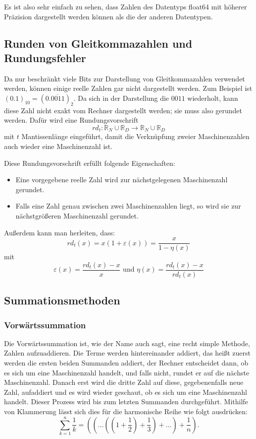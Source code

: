 \documentclass{scrartcl}
\begin{document}
Es ist also sehr einfach zu sehen, dass Zahlen des Datentyps float64 mit
höherer Präzision dargestellt werden können als die der anderen Datentypen.

\subsection{Runden von Gleitkommazahlen und Rundungsfehler}
Da nur beschränkt viele Bits zur Darstellung von Gleitkommazahlen verwendet
werden, können einige reelle Zahlen gar nicht dargestellt werden.
Zum Beispiel ist \( (0.1)_{10} = (0.
\overline{0011})_2 \).
Da sich in der Darstellung die \(0011\) wiederholt, kann diese Zahl nicht exakt
vom Rechner dargestellt werden; sie muss also gerundet werden.
Dafür wird eine Rundungsvorschrift
\begin{equation*}
    rd_t: \mathbb{R}_N \cup \mathbb{R}_D \rightarrow \mathbb{R}_N \cup \mathbb{R}_D
\end{equation*}
mit \(t\) Mantissenlänge eingeführt, damit die Verknüpfung zweier Maschinenzahlen auch wieder eine
Maschinenzahl ist.

Diese Rundungsvorschrift erfüllt folgende Eigenschaften:
\begin{itemize}
    \item Eine vorgegebene reelle Zahl wird zur nächstgelegenen Maschinenzahl gerundet.
    \item Falls eine Zahl genau zwischen zwei Maschinenzahlen liegt, so wird sie zur nächstgrößeren Maschinenzahl gerundet.
\end{itemize}

Außerdem kann man herleiten, dass: \[ rd_t(x) = x(1+\varepsilon(x)) =
    \frac{x}{1-\eta(x)} \] mit \[ \varepsilon(x) = \frac{rd_t(x) - x}{x} \text{ und
    } \eta(x) = \frac{rd_t(x) - x}{rd_t(x)} \]

\subsection{Summationsmethoden} \subsubsection{Vorwärtssummation} Die
Vorwärtssummation ist, wie der Name auch sagt, eine recht simple Methode,
Zahlen aufzuaddieren.
Die Terme werden hintereinander addiert, das heißt zuerst werden die ersten
beiden Summanden addiert, der Rechner entscheidet dann, ob es sich um eine
Maschinenzahl handelt, und falls nicht, rundet er auf die nächste
Maschinenzahl.
Danach erst wird die dritte Zahl auf diese, gegebenenfalls neue Zahl,
aufaddiert und es wird wieder geschaut, ob es sich um eine Maschinenzahl
handelt.
Dieser Prozess wird bis zum letzten Summanden durchgeführt.
Mithilfe von Klammerung lässt sich dies für die harmonische Reihe wie folgt
ausdrücken:
\begin{equation*}
    \sum_{k=1}^{n} \frac{1}{k} = ((\ldots((1 + \frac{1}{2}) + \frac{1}{3}) + \ldots) + \frac{1}{n}).
\end{equation*}
\end{document}
